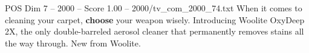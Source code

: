 \begin{textsample}{POS Dim 7 – 2000 – Score 1.00 – 2000/tv\_com\_2000\_74.txt}  \label{ex:f7_pos_056}
When it comes to cleaning your carpet, \textbf{choose} your weapon wisely.
Introducing Woolite OxyDeep 2X, the only double-barreled aerosol cleaner that permanently removes stains all the way through.
New from Woolite.

\end{textsample}
